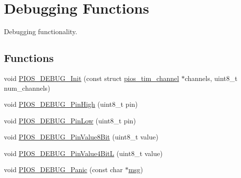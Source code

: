 \hypertarget{group___p_i_o_s___d_e_b_u_g}{\section{\-Debugging \-Functions}
\label{group___p_i_o_s___d_e_b_u_g}
}


\-Debugging functionality.  


\subsection*{\-Functions}
\begin{DoxyCompactItemize}
\item 
void \hyperlink{group___p_i_o_s___d_e_b_u_g_ga798f6007adad3e5de566d49c17695899}{\-P\-I\-O\-S\-\_\-\-D\-E\-B\-U\-G\-\_\-\-Init} (const struct \hyperlink{structpios__tim__channel}{pios\-\_\-tim\-\_\-channel} $\ast$channels, uint8\-\_\-t num\-\_\-channels)
\item 
void \hyperlink{group___p_i_o_s___d_e_b_u_g_ga7eabdd0ec4d323e1ae683708e32694a3}{\-P\-I\-O\-S\-\_\-\-D\-E\-B\-U\-G\-\_\-\-Pin\-High} (uint8\-\_\-t pin)
\item 
void \hyperlink{group___p_i_o_s___d_e_b_u_g_ga8ac0ce4c2f2fa85c17f8de9740bc2026}{\-P\-I\-O\-S\-\_\-\-D\-E\-B\-U\-G\-\_\-\-Pin\-Low} (uint8\-\_\-t pin)
\item 
void \hyperlink{group___p_i_o_s___d_e_b_u_g_ga2e5f7854424b8a04f1972f6cdd13fdbd}{\-P\-I\-O\-S\-\_\-\-D\-E\-B\-U\-G\-\_\-\-Pin\-Value8\-Bit} (uint8\-\_\-t value)
\item 
void \hyperlink{group___p_i_o_s___d_e_b_u_g_ga4d4cd4268ab3201b753eadde5a58c0b4}{\-P\-I\-O\-S\-\_\-\-D\-E\-B\-U\-G\-\_\-\-Pin\-Value4\-Bit\-L} (uint8\-\_\-t value)
\item 
void \hyperlink{group___p_i_o_s___d_e_b_u_g_gae3876733b5e6b40c8fcbdb683d206068}{\-P\-I\-O\-S\-\_\-\-D\-E\-B\-U\-G\-\_\-\-Panic} (const char $\ast$\hyperlink{_libraries_2rscode_2example_8c_a6248cb5c33683ab9f937d2a954646849}{msg})
\end{DoxyCompactItemize}
